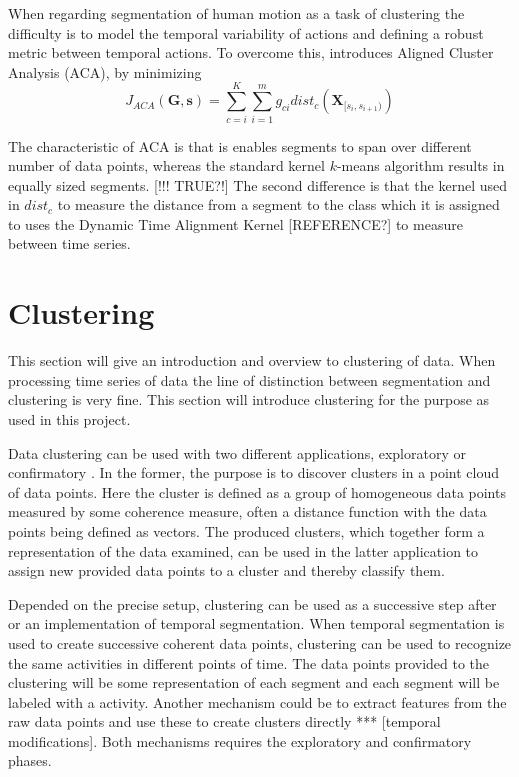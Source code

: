 When regarding segmentation of human motion as a task of clustering the difficulty is to model the temporal variability of actions and defining a robust metric between temporal actions.
To overcome this, \cite{zhou2008aligned} introduces Aligned Cluster Analysis (ACA), by minimizing
\begin{equation}
	\label{eq:ACA}
	J_{\mathit{ACA}}(\mathbf{G},\mathbf{s}) = \sum_{c=i}^{K} \sum_{i=1}^{m} g_{ci} \mathit{dist}_c (\mathbf{X}_{[s_i,s_{i+1})})
\end{equation}

The characteristic of ACA is that is enables segments to span over different number of data points, whereas the standard kernel $k$-means algorithm results in equally sized segments.
[!!! TRUE?!] The second difference is that the kernel used in $\mathit{dist}_c$ to measure the distance from a segment to the class which it is assigned to uses the Dynamic Time Alignment Kernel [REFERENCE?] to measure between time series.


\section{Clustering}

This section will give an introduction and overview to clustering of data.
When processing time series of data the line of distinction between segmentation and clustering is very fine.
This section will introduce clustering for the purpose as used in this project.

Data clustering can be used with two different applications, exploratory or confirmatory \cite{jain1999data}.
In the former, the purpose is to discover clusters in a point cloud of data points.
Here the cluster is defined as a group of homogeneous data points measured by some coherence measure, often a distance function with the data points being defined as vectors.
The produced clusters, which together form a representation of the data examined, can be used in the latter application to assign new provided data points to a cluster and thereby classify them.

Depended on the precise setup, clustering can be used as a successive step after or an implementation of temporal segmentation.
When temporal segmentation is used to create successive coherent data points, clustering can be used to recognize the same activities in different points of time.
The data points provided to the clustering will be some representation of each segment and each segment will be labeled with a activity.
Another mechanism could be to extract features from the raw data points and use these to create clusters directly *** [temporal modifications].
Both mechanisms requires the exploratory and confirmatory phases.

